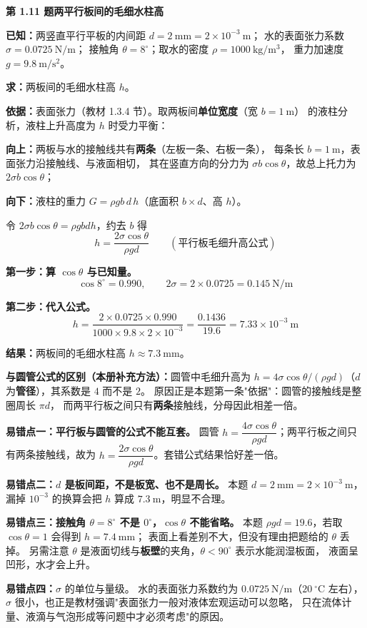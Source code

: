 \noindent\textbf{第 1.11 题\quad 两平行板间的毛细水柱高}

\begin{jie}
\textbf{已知：}两竖直平行平板的内间距 $d=2\ \mathrm{mm}=2\times10^{-3}\ \mathrm{m}$；
水的表面张力系数 $\sigma=0.0725\ \mathrm{N/m}$；
接触角 $\theta=8^{\circ}$；取水的密度 $\rho=1000\ \mathrm{kg/m^3}$，
重力加速度 $g=9.8\ \mathrm{m/s^2}$。

\textbf{求：}两板间的毛细水柱高 $h$。

\textbf{依据：}表面张力（教材 1.3.4 节）。取两板间\textbf{单位宽度}（宽 $b=1\ \mathrm{m}$）
的液柱分析，液柱上升高度为 $h$ 时受力平衡：
\begin{xiaowen}
\item \textbf{向上：}两板与水的接触线共有\textbf{两条}（左板一条、右板一条），
每条长 $b=1\ \mathrm{m}$，表面张力沿接触线、与液面相切，
其在竖直方向的分力为 $\sigma b\cos\theta$，故总上托力为 $2\sigma b\cos\theta$；
\item \textbf{向下：}液柱的重力 $G=\rho g b\,d\,h$（底面积 $b\times d$、高 $h$）。
\end{xiaowen}
令 $2\sigma b\cos\theta=\rho g b d h$，约去 $b$ 得
\[ h=\frac{2\sigma\cos\theta}{\rho g d}\qquad(\text{平行板毛细升高公式}) \]

\textbf{第一步：算 $\cos\theta$ 与已知量。}
\[ \cos 8^{\circ}=0.990,\qquad
   2\sigma=2\times0.0725=0.145\ \mathrm{N/m} \]

\textbf{第二步：代入公式。}
\[ h=\frac{2\times0.0725\times0.990}{1000\times9.8\times2\times10^{-3}}
   =\frac{0.1436}{19.6}=7.33\times10^{-3}\ \mathrm{m} \]

\textbf{结果：}两板间的毛细水柱高 $h\approx7.3\ \mathrm{mm}$。

\textbf{与圆管公式的区别（本册补充方法）：}圆管中毛细升高为
$h=4\sigma\cos\theta/(\rho g d)$（$d$ 为\textbf{管径}），其系数是 $4$ 而不是 $2$。
原因正是本题第一条"依据"：圆管的接触线是整圈周长 $\pi d$，
而两平行板之间只有\textbf{两条}接触线，分母因此相差一倍。
\end{jie}

\begin{yicuo}
\textbf{易错点一：平行板与圆管的公式不能互套。}
圆管 $h=\dfrac{4\sigma\cos\theta}{\rho g d}$；两平行板之间只有两条接触线，故为
$h=\dfrac{2\sigma\cos\theta}{\rho g d}$。套错公式结果恰好差一倍。

\textbf{易错点二：$d$ 是\textbf{板间距}，不是板宽、也不是周长。}
本题 $d=2\ \mathrm{mm}=2\times10^{-3}\ \mathrm{m}$，
漏掉 $10^{-3}$ 的换算会把 $h$ 算成 $7.3\ \mathrm{m}$，明显不合理。

\textbf{易错点三：接触角 $\theta=8^{\circ}$ 不是 $0^{\circ}$，$\cos\theta$ 不能省略。}
本题 $\rho g d=19.6$，若取 $\cos\theta=1$ 会得到 $h=7.4\ \mathrm{mm}$；
表面上看差别不大，但没有理由把题给的 $\theta$ 丢掉。
另需注意 $\theta$ 是液面切线与\textbf{板壁}的夹角，$\theta<90^{\circ}$ 表示水能润湿板面，
液面呈凹形，水才会上升。

\textbf{易错点四：}$\sigma$ 的单位与量级。
水的表面张力系数约为 $0.0725\ \mathrm{N/m}$（$20\ ^{\circ}\mathrm{C}$ 左右），
$\sigma$ 很小，也正是教材强调"表面张力一般对液体宏观运动可以忽略，
只在流体计量、液滴与气泡形成等问题中才必须考虑"的原因。
\end{yicuo}


